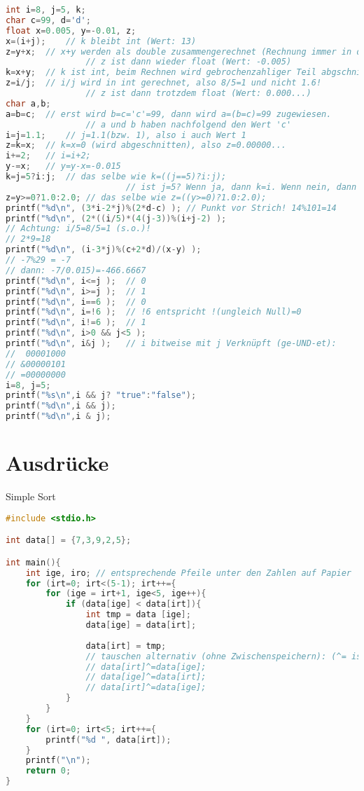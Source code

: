 \documentclass{scrreprt}
\begin{document}
\begin{lstlisting}[language=C]
int i=8, j=5, k;
char c=99, d='d';
float x=0.005, y=-0.01, z;
x=(i+j);	// k bleibt int (Wert: 13)
z=y+x;	// x+y werden als double zusammengerechnet (Rechnung immer in double).
				// z ist dann wieder float (Wert: -0.005)
k=x+y;	// k ist int, beim Rechnen wird gebrochenzahliger Teil abgschnitten (Wert: 0)
z=i/j;	// i/j wird in int gerechnet, also 8/5=1 und nicht 1.6! 
				// z ist dann trotzdem float (Wert: 0.000...)
char a,b;
a=b=c;	// erst wird b=c='c'=99, dann wird a=(b=c)=99 zugewiesen. 
				// a und b haben nachfolgend den Wert 'c'
i=j=1.1;	// j=1.1(bzw. 1), also i auch Wert 1
z=k=x;	// k=x=0 (wird abgeschnitten), also z=0.00000...
i+=2;	// i=i+2;
y-=x;	// y=y-x=-0.015
k=j=5?i:j;	// das selbe wie k=((j==5)?i:j);
						// ist j=5? Wenn ja, dann k=i. Wenn nein, dann k=j.
z=y>=0?1.0:2.0;	// das selbe wie z=((y>=0)?1.0:2.0);
printf("%d\n", (3*i-2*j)%(2*d-c) );	// Punkt vor Strich! 14%101=14
printf("%d\n", (2*((i/5)*(4(j-3))%(i+j-2) );
// Achtung: i/5=8/5=1 (s.o.)!
// 2*9=18
printf("%d\n", (i-3*j)%(c+2*d)/(x-y) );
// -7%29 = -7
// dann: -7/0.015)=-466.6667
printf("%d\n", i<=j );	// 0
printf("%d\n", i>=j );	// 1
printf("%d\n", i==6 );	// 0
printf("%d\n", i=!6 );	// !6 entspricht !(ungleich Null)=0
printf("%d\n", i!=6 );	// 1
printf("%d\n", i>0 && j<5 );
printf("%d\n", i&j );	// i bitweise mit j Verknüpft (ge-UND-et):
//  00001000
// &00000101
// =00000000
i=8, j=5;
printf("%s\n",i && j? "true":"false");
printf("%d\n",i && j);
printf("%d\n",i & j);
\end{lstlisting}

\chapter{Ausdrücke}

Simple Sort

\begin{lstlisting}[language=C]
#include <stdio.h>

int data[] = {7,3,9,2,5};

int main(){
	int ige, iro; // entsprechende Pfeile unter den Zahlen auf Papier
	for (irt=0; irt<(5-1); irt++={
		for (ige = irt+1, ige<5, ige++){
			if (data[ige] < data[irt]){
				int tmp = data [ige];
				data[ige] = data[irt];
				
				data[irt] = tmp;
				// tauschen alternativ (ohne Zwischenspeichern): (^= ist XOR)
				// data[irt]^=data[ige];
				// data[ige]^=data[irt];
				// data[irt]^=data[ige];
			}
		}	
	}
	for (irt=0; irt<5; irt++={
		printf("%d ", data[irt]);
	}
	printf("\n");
	return 0;
}
\end{lstlisting}
\end{document}
